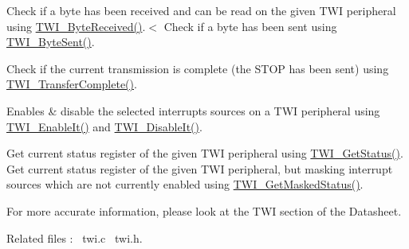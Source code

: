 \begin{DoxyItemize}
\item Check if a byte has been received and can be read on the given T\+WI peripheral using \mbox{\hyperlink{arm_2atsam_2contrib_2libraries_2libchip_2source_2twi_8c_a2bb399b4984df2fdaabf741326636de2}{T\+W\+I\+\_\+\+Byte\+Received()}}.$<$ Check if a byte has been sent using \mbox{\hyperlink{arm_2atsam_2contrib_2libraries_2libchip_2source_2twi_8c_a908535df2873ebeaa63f6fda73ea6708}{T\+W\+I\+\_\+\+Byte\+Sent()}}. 
\item Check if the current transmission is complete (the S\+T\+OP has been sent) using \mbox{\hyperlink{arm_2atsam_2contrib_2libraries_2libchip_2source_2twi_8c_a8d8a0d10a7d128428c350f7337191fbd}{T\+W\+I\+\_\+\+Transfer\+Complete()}}. 
\item Enables \& disable the selected interrupts sources on a T\+WI peripheral using \mbox{\hyperlink{arm_2atsam_2contrib_2libraries_2libchip_2source_2twi_8c_ab3bf1b5df694229af5fae34ca569ab7b}{T\+W\+I\+\_\+\+Enable\+It()}} and \mbox{\hyperlink{arm_2atsam_2contrib_2libraries_2libchip_2source_2twi_8c_ac976e61b9b9d4488753f960d3df80c63}{T\+W\+I\+\_\+\+Disable\+It()}}. 
\item Get current status register of the given T\+WI peripheral using \mbox{\hyperlink{arm_2atsam_2contrib_2libraries_2libchip_2source_2twi_8c_a316b5d5ffbfa49a8d6517a061b92a4a6}{T\+W\+I\+\_\+\+Get\+Status()}}. Get current status register of the given T\+WI peripheral, but masking interrupt sources which are not currently enabled using \mbox{\hyperlink{arm_2atsam_2contrib_2libraries_2libchip_2source_2twi_8c_aee8c3520f24c54aedbad6cee6ab2eeaa}{T\+W\+I\+\_\+\+Get\+Masked\+Status()}}. 
\end{DoxyItemize}For more accurate information, please look at the T\+WI section of the Datasheet.

Related files \+:~\newline
twi.\+c~\newline
 twi.\+h.~\newline
 
